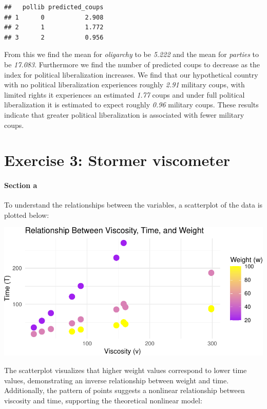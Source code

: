 \documentclass[
  11pt,
]{article}
\begin{document}
\begin{verbatim}
##   pollib predicted_coups
## 1      0           2.908
## 2      1           1.772
## 3      2           0.956
\end{verbatim}

From this we find the mean for \emph{oligarchy} to be \emph{5.222} and
the mean for \emph{parties} to be \emph{17.083}. Furthermore we find the
number of predicted coups to decrease as the index for political
liberalization increases. We find that our hypothetical country with no
political liberalization experiences roughly \emph{2.91} military coups,
with limited rights it experiences an estimated \emph{1.77} coups and
under full political liberalization it is estimated to expect roughly
\emph{0.96} military coups. These results indicate that greater
political liberalization is associated with fewer military coups.

\section{Exercise 3: Stormer
viscometer}\label{exercise-3-stormer-viscometer}

\paragraph{Section a}\label{section-a-2}

To understand the relationships between the variables, a scatterplot of
the data is plotted below:

\includegraphics{ReportAssignment2_files/figure-latex/unnamed-chunk-20-1.pdf}

The scatterplot visualizes that higher weight values correspond to lower
time values, demonstrating an inverse relationship between weight and
time. Additionally, the pattern of points suggests a nonlinear
relationship between viscosity and time, supporting the theoretical
nonlinear model:
\end{document}
